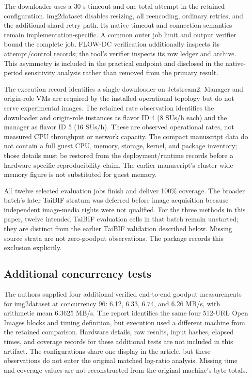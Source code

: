 \documentclass[10pt]{article}
\begin{document}
The downloader uses a 30-s timeout and one total attempt in the retained configuration. img2dataset disables resizing, all reencoding, ordinary retries, and the additional shard retry path. Its native timeout and connection semantics remain implementation-specific. A common outer job limit and output verifier bound the complete job. FLOW-DC verification additionally inspects its attempt/control records; the tool's verifier inspects its row ledger and archive. This asymmetry is included in the practical endpoint and disclosed in the native-period sensitivity analysis rather than removed from the primary result.

The execution record identifies a single downloader on Jetstream2. Manager and origin-role VMs are required by the installed operational topology but do not serve experimental images. The retained rate observation identifies the downloader and origin-role instances as flavor ID 4 (8 SUs/h each) and the manager as flavor ID 5 (16 SUs/h). These are observed operational rates, not measured CPU throughput or network capacity. The compact manuscript data do not contain a full guest CPU, memory, storage, kernel, and package inventory; those details must be restored from the deployment/runtime records before a hardware-specific reproducibility claim. The earlier manuscript's cluster-wide memory figure is not substituted for guest memory.

All twelve selected evaluation jobs finish and deliver 100\% coverage. The broader batch's later TaiBIF stratum was deferred before image acquisition because independent image-media rights were not qualified. For the three methods in this paper, twelve intended TaiBIF evaluation cells in that batch remain unstarted; they are distinct from the earlier TaiBIF validation described below. Missing source strata are not zero-goodput observations. The package records this exclusion explicitly.

\subsection{Additional concurrency tests}
The authors supplied four additional verified end-to-end goodput measurements for img2dataset at concurrency 96: 6.12, 6.33, 6.74, and 6.26 MB/s, with arithmetic mean 6.3625 MB/s. The report identifies the same four 512-URL Open Images blocks and timing definition, but execution used a different machine from the retained comparison. Hardware details, raw results, input hashes, elapsed times, and coverage records for these additional tests are not included in this artifact. The configurations share one display in the article, but these observations do not enter the original matched log-ratio analysis. Missing time and coverage values are not reconstructed from the original machine's byte totals.
\end{document}
